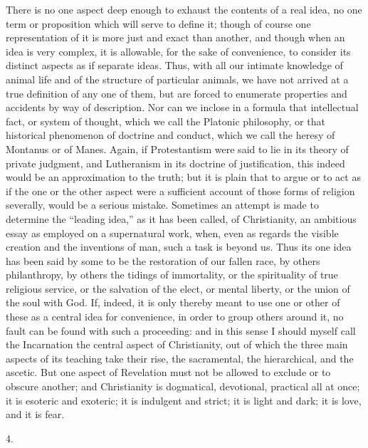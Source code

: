There is no one aspect deep enough to exhaust the
contents of a real idea, no one term or proposition which
will serve to define it; though of course one
representation of it is more just and exact than another,
and though when an idea is very complex, it is allowable,
for the sake of convenience, to consider its distinct
aspects as if separate ideas. Thus, with all our intimate
knowledge of animal life and of the structure of
particular animals, we have not arrived at a true
definition of any one of them, but are forced to
enumerate properties and accidents by way of description.
Nor can we inclose in a formula that intellectual fact,
or system of thought, which we call the Platonic
philosophy, or that historical phenomenon of doctrine and
conduct, which we call the heresy of Montanus or of
Manes. Again, if Protestantism were said to lie in its
theory of private judgment, and Lutheranism in its
doctrine of justification, this indeed would be an
approximation to the truth; but it is plain that to argue
or to act as if the one or the other aspect were a
sufficient account of those forms of religion severally,
would be a serious mistake. Sometimes an attempt is made
to determine the ``leading idea,'' as it has been
called, of Christianity, an ambitious essay as employed
on a supernatural work, when, even as regards the visible
creation and the inventions of man, such a task is beyond
us. Thus its one idea has been said by some to be the
restoration of our fallen race, by others philanthropy,
by others the tidings of immortality, or the spirituality
of true religious service, or the salvation of the elect,
or mental liberty, or the union of the soul with God. If,
indeed, it is only thereby meant to use one or other of
these as a central idea for convenience, in order to
group others around it, no fault can be found with such a
proceeding: and in this sense I should myself call the
Incarnation the central aspect of Christianity, out of
which the three main aspects of its teaching take their
rise, the sacramental, the hierarchical, and the ascetic.
But one aspect of Revelation must not be allowed to
exclude or to obscure another; and Christianity is
dogmatical, devotional, practical all at once; it is
esoteric and exoteric; it is indulgent and strict; it is
light and dark; it is love, and it is fear.

4.

